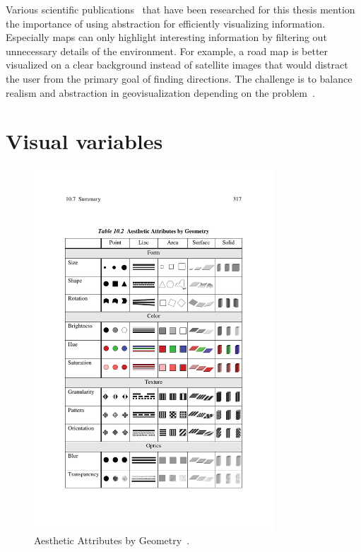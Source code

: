 Various scientific publications~\cite{phillips82clutter, MACEACHREN90apattern, keim2001vis, harvey2008primer, ellis08clutter, Delort10vis, noellenburg11geovis} that have been researched for this thesis mention the importance of using abstraction for efficiently visualizing information. Especially maps can only highlight interesting information by filtering out unnecessary details of the environment. For example, a road map is better visualized on a clear background instead of satellite images that would distract the user from the primary goal of finding directions. The challenge is to balance realism and abstraction in geovisualization depending on the problem~\cite{noellenburg11geovis}.

\newpage
\section{Visual variables}
\label{chapter:vis-variables}

\begin{figure}[h]
  \begin{center}
    \includegraphics[width=0.8\textwidth]{figures/aesthetic_attributes.pdf}
    \caption{Aesthetic Attributes by Geometry~\cite{Wilkinson05grammar}.}
    \label{fig:aesthetic-attributes}
  \end{center}
\end{figure}

